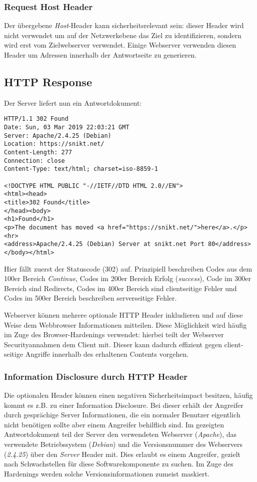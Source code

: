 \subsubsection{Request Host Header}

Der übergebene \textit{Host}-Header kann sicherheitsrelevant sein: dieser Header wird nicht verwendet um auf der Netzwerkebene das Ziel zu identifizieren, sondern wird erst vom Zielwebserver verwendet. Einige Webserver verwenden diesen Header um Adressen innerhalb der Antwortseite zu generieren.

\subsection{HTTP Response}

Der Server liefert nun ein Antwortdokument:

\begin{verbatim}
HTTP/1.1 302 Found
Date: Sun, 03 Mar 2019 22:03:21 GMT
Server: Apache/2.4.25 (Debian)
Location: https://snikt.net/
Content-Length: 277
Connection: close
Content-Type: text/html; charset=iso-8859-1

<!DOCTYPE HTML PUBLIC "-//IETF//DTD HTML 2.0//EN">
<html><head>
<title>302 Found</title>
</head><body>
<h1>Found</h1>
<p>The document has moved <a href="https://snikt.net/">here</a>.</p>
<hr>
<address>Apache/2.4.25 (Debian) Server at snikt.net Port 80</address>
</body></html>
\end{verbatim}

Hier fällt zuerst der Statuscode (302) auf. Prinzipiell beschreiben Codes aus dem 100er Bereich \textit{Continue}, Codes im 200er Bereich Erfolg (\textit{success}), Code im 300er Bereich sind Redirects, Codes im 400er Bereich sind clientseitige Fehler und Codes im 500er Bereich beschreiben serverseitige Fehler.

Webserver können mehrere optionale HTTP Header inkludieren und auf diese Weise dem Webbrowser Informationen mitteilen. Diese Möglichkeit wird häufig im Zuge des Browser-Hardenings verwendet: hierbei teilt der Webserver Securityannahmen dem Client mit. Dieser kann dadurch effizient gegen client-seitige Angriffe innerhalb des erhaltenen Contents vorgehen.

\subsubsection{Information Disclosure durch HTTP Header}

Die optionalen Header können einen negativen Sicherheitsimpact besitzen, häufig kommt es z.B. zu einer Information Disclosure. Bei dieser erhält der Angreifer durch gesprächige Server Informationen, die ein normaler Benutzer eigentlich nicht benötigen sollte aber einem Angreifer behilflich sind. Im gezeigten Antwortdokument teil der Server den verwendeten Webserver (\textit{Apache}), das verwendete Betriebssystem (\textit{Debian}) und die Versionsnummer des Webservers (\textit{2.4.25}) über den \textit{Server} Header mit. Dies erlaubt es einem Angreifer, gezielt nach Schwachstellen für diese Softwarekomponente zu suchen. Im Zuge des Hardenings werden solche Versionsinformationen zumeist maskiert.


